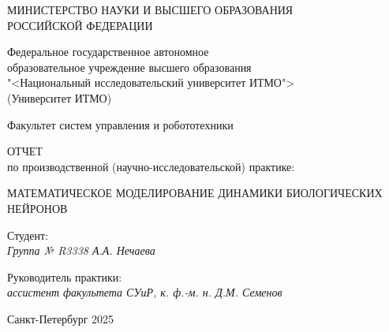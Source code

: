 \thispagestyle{empty}

\begin{center}
    МИНИСТЕРСТВО НАУКИ И ВЫСШЕГО ОБРАЗОВАНИЯ \\ РОССИЙСКОЙ ФЕДЕРАЦИИ

    \vspace{20pt}

    Федеральное государственное автономное \\ образовательное учреждение высшего образования \\
    "<Национальный исследовательский университет ИТМО"> \\
    (Университет ИТМО)

    \vspace{20pt}

    Факультет систем управления и робототехники 
\end{center}

\vfill

\begin{center}
    ОТЧЕТ \\  
    по производственной (научно-исследовательской) практике: 
    \vspace{20pt}
    
    \uppercase{Математическое моделирование динамики биологических нейронов}
    \vspace{20pt}
    
    

    \vspace{20pt}
    
   

\end{center}

\vfill

    \noindent Студент: \\
    \textit{Группа № R3338 \hfill А.А. Нечаева}
    \vspace{20pt}

    \noindent Руководитель практики: \\
    \textit{ассистент факультета СУиР, к. ф.-м. н. \hfill Д.М. Семенов}

\vfill

\begin{center}
    Санкт-Петербург 2025
\end{center}